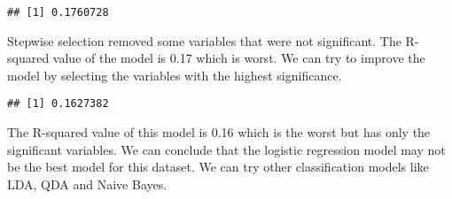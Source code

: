 \documentclass[
]{article}
\newenvironment{Shaded}{\begin{snugshade}}{\end{snugshade}}
\newcommand{\AttributeTok}[1]{\textcolor[rgb]{0.13,0.29,0.53}{#1}}
\newcommand{\DecValTok}[1]{\textcolor[rgb]{0.00,0.00,0.81}{#1}}
\newcommand{\FunctionTok}[1]{\textcolor[rgb]{0.13,0.29,0.53}{\textbf{#1}}}
\newcommand{\NormalTok}[1]{#1}
\newcommand{\OtherTok}[1]{\textcolor[rgb]{0.56,0.35,0.01}{#1}}
\newcommand{\SpecialCharTok}[1]{\textcolor[rgb]{0.81,0.36,0.00}{\textbf{#1}}}
\begin{document}
\begin{verbatim}
## [1] 0.1760728
\end{verbatim}

Stepwise selection removed some variables that were not significant. The
R-squared value of the model is 0.17 which is worst. We can try to
improve the model by selecting the variables with the highest
significance.

\begin{Shaded}
\end{Shaded}

\begin{verbatim}
## [1] 0.1627382
\end{verbatim}

The R-squared value of this model is 0.16 which is the worst but has
only the significant variables. We can conclude that the logistic
regression model may not be the best model for this dataset. We can try
other classification models like LDA, QDA and Naive Bayes.
\end{document}
